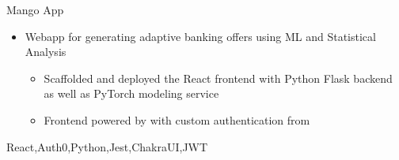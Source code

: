 %
%
%


\begin{projects}
	\project
	{Mango App}{ }
	{}
	{\begin{itemize}
        \setlength\itemsep{0.2em}
        \item{Webapp for generating adaptive banking offers using ML and Statistical Analysis}
        \begin{itemize}
            \setlength\itemsep{0.2em}
            \item{Scaffolded and deployed the React frontend with Python Flask backend as well as PyTorch modeling service}
            \item{Frontend powered by  with custom authentication from }
        \end{itemize}   
      \end{itemize}
    }
	{React,Auth0,Python,Jest,ChakraUI,JWT}
\end{projects}
